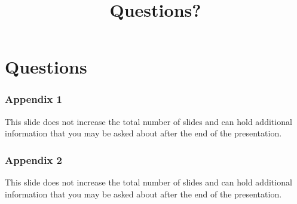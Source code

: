 \documentclass[11pt,t,usepdftitle=false,aspectratio=169]{beamer}
\begin{document}
\title{Questions?}
\subtitle{}
\section{Questions}


\appendix

\begin{frame}
\frametitle{Appendix 1}
    This slide does not increase the total number of slides and can hold additional information
    that you may be asked about after the end of the presentation.
\end{frame}

\begin{frame}
\frametitle{Appendix 2}
    This slide does not increase the total number of slides and can hold additional information
    that you may be asked about after the end of the presentation.
\end{frame}
\end{document}
